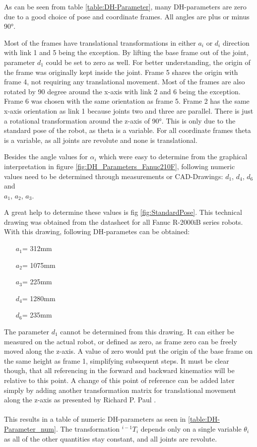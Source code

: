 As can be seen from table \ref{table:DH-Parameter}, many \ac{DH}-parameters are zero due to a good choice of pose and coordinate frames. 
All angles are plus or minus 90°.
 
Most of the frames have translational transformations in either $a_i$ or $d_i$ direction with link 1 and 5 being the exception.
By lifting the base frame out of the joint, parameter $d_1$ could be set to zero as well. For better understanding, the origin of the frame was originally kept inside the joint.
Frame 5 shares the origin with frame 4, not requiring any translational movement.
Most of the frames are also rotated by 90 degree around the x-axis with link 2 and 6 being the exception. Frame 6 was chosen with the same orientation as frame 5. Frame 2 has the same x-axis orientation as link 1 because joints two and three are parallel. There is just a rotational transformation around the z-axis of 90°. This is only due to the standard pose of the robot, as theta is a variable.
For all coordinate frames theta is a variable, as all joints are revolute and none is translational. 

Besides the angle values for $\alpha_i$ which were easy to determine from the graphical interpretation in figure \ref{fig:DH_Parameters_Fanuc210F}, following numeric values need to be determined through measurements or CAD-Drawings:
$d_1$, $d_4$, $d_6$ and \\
$a_1$, $a_2$, $a_3$. 

A great help to determine these values is fig \ref{fig:StandardPose}. This technical drawing was obtained from the datasheet for all Fanuc R-2000iB series robots. 
With this drawing, following \ac{DH}-parametes can be obtained:

\begin{itemize}\label{item:DH-LinparamValues}
	\item[$a_1$=] 312mm
	\item[$a_2$=] 1075mm
	\item[$a_3$=] 225mm
	\item[$d_4$=] 1280mm
	\item[$d_6$=] 235mm
\end{itemize}

The parameter $d_1$ cannot be determined from this drawing. It can either be measured on the actual robot, or defined as zero, as frame zero can be freely moved along the z-axis. A value of zero would put the origin of the base frame on the same height as frame 1, simplifying subsequent steps. 
It must be clear though, that all referencing in the forward and backward kinematics will be relative to this point. 
A change of this point of reference can be added later simply by adding another transformation matrix for translational movement along the z-axis as presented by Richard P. Paul \cite{Paul1981RobotM}.\\
\\
This results in a table of numeric DH-parameters as seen in \ref{table:DH-Parameter_num}. The transformation $^{i-1}T_i$ depends only on a single variable $\theta_i$ as all of the other quantities stay constant, and all joints are revolute.


